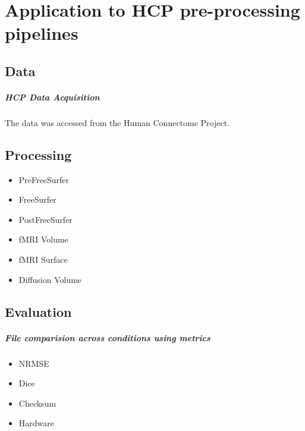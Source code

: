 \chapter{Application to HCP pre-processing pipelines}

\section{Data}
\paragraph{HCP Data Acquisition}
The data was accessed from the Human Connectome Project. 
\section{Processing}
\begin{itemize}
  \item PreFreeSurfer
  \item FreeSurfer
  \item PostFreeSurfer
  \item fMRI Volume
  \item fMRI Surface
  \item Diffusion Volume
\end{itemize}

\section{Evaluation}
\paragraph{File comparision across conditions using metrics}
\begin{itemize}
  \item NRMSE
  \item Dice
  \item Checksum
  \item Hardware
\end{itemize}
